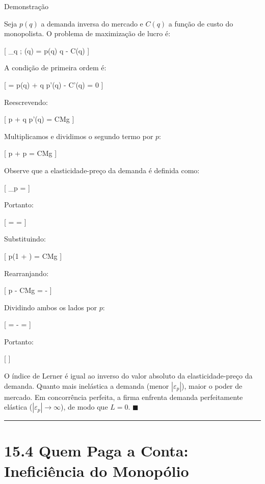 \documentclass[11pt,twoside,openright]{book}
\begin{document}
\begin{proofbox}{Demonstração}

Seja \(p(q)\) a demanda inversa do mercado e \(C(q)\) a função de custo
do monopolista. O problema de maximização de lucro é:

{[} \max\_q ; \pi(q) = p(q) \cdot q - C(q) {]}

A condição de primeira ordem é:

{[}  = p(q) + q \cdot p'(q) - C'(q) = 0 {]}

Reescrevendo:

{[} p + q \cdot p'(q) = CMg {]}

Multiplicamos e dividimos o segundo termo por \(p\):

{[} p + p \cdot {} = CMg {]}

Observe que a elasticidade-preço da demanda é definida como:

{[} \varepsilon\_p =  \cdot {} {]}

Portanto:

{[}  =  \cdot {} =
 {]}

Substituindo:

{[} p\left(1 + \right) = CMg {]}

Rearranjando:

{[} p - CMg = - {]}

Dividindo ambos os lados por \(p\):

{[}  = - =
 {]}

Portanto:

{[} 
\label{eq:15.7}  {]}

O índice de Lerner é igual ao inverso do valor absoluto da
elasticidade-preço da demanda. Quanto mais inelástica a demanda (menor
\(|\varepsilon_p|\)), maior o poder de mercado. Em concorrência
perfeita, a firma enfrenta demanda perfeitamente elástica
(\(|\varepsilon_p| \to \infty\)), de modo que \(L = 0\).
\(\blacksquare\)

\end{proofbox}

\begin{center}\rule{0.5\linewidth}{0.5pt}\end{center}

\section{15.4 Quem Paga a Conta: Ineficiência do Monopólio}\label{154}
\end{document}
